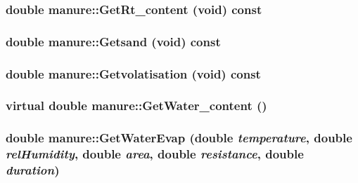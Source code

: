 \label{classmanure_a7b77b90caee4bc5fcf2dea610ffdd321}
\hypertarget{classmanure_af02a1de2138e4c9e2aa182a2891e5182}{
\subsubsection[{GetRt\_\-content}]{\setlength{\rightskip}{0pt plus 5cm}double manure::GetRt\_\-content (void) const}}
\label{classmanure_af02a1de2138e4c9e2aa182a2891e5182}
\hypertarget{classmanure_aae99257f7fb59e92b218339362b9cb4b}{
\subsubsection[{Getsand}]{\setlength{\rightskip}{0pt plus 5cm}double manure::Getsand (void) const}}
\label{classmanure_aae99257f7fb59e92b218339362b9cb4b}
\hypertarget{classmanure_a2e85d960cb09d2a21943c7968402f23a}{
\subsubsection[{Getvolatisation}]{\setlength{\rightskip}{0pt plus 5cm}double manure::Getvolatisation (void) const}}
\label{classmanure_a2e85d960cb09d2a21943c7968402f23a}
\hypertarget{classmanure_a25045c87941e46b757c706e7fd179a37}{
\subsubsection[{GetWater\_\-content}]{\setlength{\rightskip}{0pt plus 5cm}virtual double manure::GetWater\_\-content ()}}
\label{classmanure_a25045c87941e46b757c706e7fd179a37}
\hypertarget{classmanure_a6aba3f146ff412c234583f5f1c805000}{
\subsubsection[{GetWaterEvap}]{\setlength{\rightskip}{0pt plus 5cm}double manure::GetWaterEvap (double {\em temperature}, \/  double {\em relHumidity}, \/  double {\em area}, \/  double {\em resistance}, \/  double {\em duration})}}

